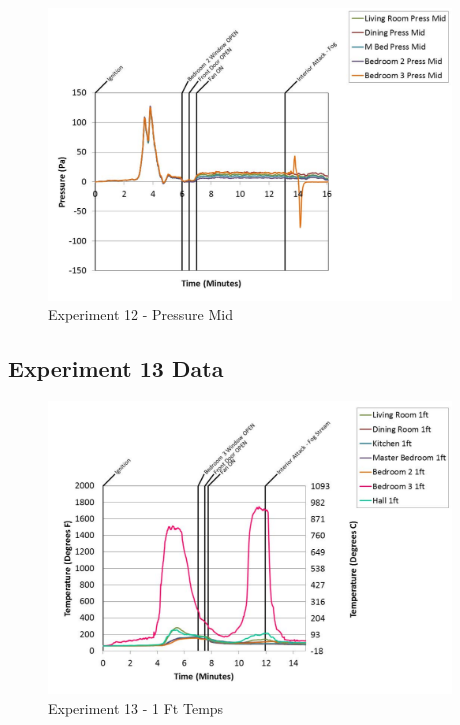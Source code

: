 \documentclass{article}
\begin{document}
\begin{appendices}
	\begin{figure}[h!]
		\centering
		\includegraphics[height=3.05in]{0_Images/Results_Charts/Exp_12_Charts/PressureMid.pdf}
		\caption{Experiment 12 - Pressure Mid}
	\end{figure}
 
	\clearpage

		\clearpage
\clearpage		\large
\subsection{Experiment 13 Data} \label{App:Exp13Results} 

	\begin{figure}[h!]
		\centering
		\includegraphics[height=3.05in]{0_Images/Results_Charts/Exp_13_Charts/1FtTemps.pdf}
		\caption{Experiment 13 - 1 Ft Temps}
	\end{figure}
 


\end{appendices}
\end{document}
